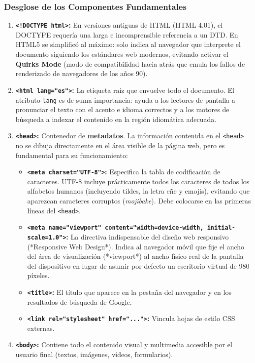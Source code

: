 \subsubsection{Desglose de los Componentes Fundamentales}
\begin{enumerate}
  \item \textbf{\texttt{<!DOCTYPE html>}:} En versiones antiguas de HTML (HTML 4.01), el DOCTYPE requería una larga e incomprensible referencia a un DTD. En HTML5 se simplificó al máximo: solo indica al navegador que interprete el documento siguiendo los estándares web modernos, evitando activar el \textbf{Quirks Mode} (modo de compatibilidad hacia atrás que emula los fallos de renderizado de navegadores de los años 90).
  \item \textbf{\texttt{<html lang="es">}:} La etiqueta raíz que envuelve todo el documento. El atributo \texttt{lang} es de suma importancia: ayuda a los lectores de pantalla a pronunciar el texto con el acento e idioma correctos y a los motores de búsqueda a indexar el contenido en la región idiomática adecuada.
  \item \textbf{\texttt{<head>}:} Contenedor de \textbf{metadatos}. La información contenida en el \texttt{<head>} no se dibuja directamente en el área visible de la página web, pero es fundamental para su funcionamiento:
    \begin{itemize}
      \item \textbf{\texttt{<meta charset="UTF-8">}:} Especifica la tabla de codificación de caracteres. UTF-8 incluye prácticamente todos los caracteres de todos los alfabetos humanos (incluyendo tildes, la letra eñe y emojis), evitando que aparezcan caracteres corruptos (\textit{mojibake}). Debe colocarse en las primeras líneas del \texttt{<head>}.
      \item \textbf{\texttt{<meta name="viewport" content="width=device-width, initial-scale=1.0">}:} La directiva indispensable del diseño web responsivo (*Responsive Web Design*). Indica al navegador móvil que fije el ancho del área de visualización (*viewport*) al ancho físico real de la pantalla del dispositivo en lugar de asumir por defecto un escritorio virtual de 980 píxeles.
      \item \textbf{\texttt{<title>}:} El título que aparece en la pestaña del navegador y en los resultados de búsqueda de Google.
      \item \textbf{\texttt{<link rel="stylesheet" href="...">}:} Vincula hojas de estilo CSS externas.
    \end{itemize}
  \item \textbf{\texttt{<body>}:} Contiene todo el contenido visual y multimedia accesible por el usuario final (textos, imágenes, vídeos, formularios).
\end{enumerate}

